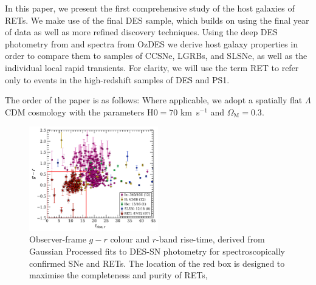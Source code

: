 \documentclass[fleqn,usenatbib,]{mnras}
\begin{document}
In this paper, we present the first comprehensive study of the host galaxies of RETs. We make use of the final DES sample, which builds on \citet{Pursiainen2018} using the final year of data as well as more refined discovery techniques. Using the deep DES photometry from \citet{Wiseman2020} and spectra from OzDES \citep{Lidman2020} we derive host galaxy properties in order to compare them to samples of CCSNe, LGRBs, and SLSNe, as well as the individual local rapid transients. For clarity, we will use the term RET to refer only to events in the high-redshift samples of DES and PS1. 

The order of the paper is as follows:
Where applicable, we adopt a spatially flat $\Lambda$CDM cosmology with the parameters H$0=70$ km~s$^{-1}$ and $\Omega_{\textrm{M}}=0.3$.

\begin{figure}
\includegraphics[width=0.5\textwidth]{figs/spec_gr_trise_r_GP5_new_colorscheme.pdf}
\caption{Observer-frame $g-r$ colour and $r$-band rise-time, derived from Gaussian Processed fits to DES-SN photometry for spectroscopically confirmed SNe and  RETs. The location of the red box is designed to maximise the completeness and purity of RETs, 
\label{fig:selection}}
\end{figure}
\end{document}

